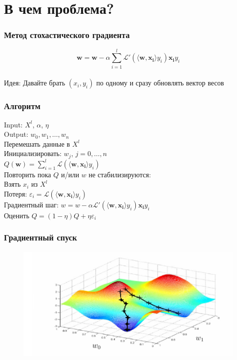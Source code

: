 \documentclass[10pt]{beamer}
\begin{document}
\section{В чем проблема?}

\begin{frame}\frametitle{Метод стохастического градиента}
	$$\mathbf{w} =  \mathbf{w} - \alpha \sum\limits_{i=1}^l \mathcal{L}'(\langle \mathbf{w}, \mathbf{x_i}\rangle y_i)\mathbf{x_i}y_i$$\\
	\bigbreak \pause
	\alert{Идея}: Давайте брать $(x_i, y_i)$ по одному и сразу обновлять вектор весов
\end{frame}

\begin{frame}\frametitle{Алгоритм}
	Input: $X^l$, $\alpha$, $\eta$\\
	Output: $w_0, w_1, \dots, w_n$\\
	\vspace{3mm}
	Перемешать данные в $X^l$\\
	Инициализировать: $w_j$, $j=0,\dots, n$\\
	\hspace{35mm} ${Q}(\mathbf{w}) = \sum\limits_{i=1}^l \mathcal{L}(\langle \mathbf{w}, \mathbf{x_i} \rangle y_i)$\\
	Повторить пока $Q$ и/или $w$ не стабилизируются:\\
	\hspace{5mm} Взять $x_i$ из $X^l$\\
	\hspace{5mm} Потеря: $\varepsilon_i = \mathcal{L}(\langle \mathbf{w}, \mathbf{x_i} \rangle y_i)$\\
	\hspace{5mm} Градиентный шаг: $w =  w - \alpha \mathcal{L}'(\langle \mathbf{w}, \mathbf{x_i}\rangle y_i)\mathbf{x_i}y_i$\\
	\hspace{5mm} Оценить $Q = (1-\eta)Q + \eta \varepsilon_i$
\end{frame}

\begin{frame}\frametitle{Градиентный спуск}
	\begin{figure}[htbp]
	  \includegraphics[height=160pt, keepaspectratio = true]{images/gradient_descent2}
	\end{figure}
\end{frame}
\end{document}
